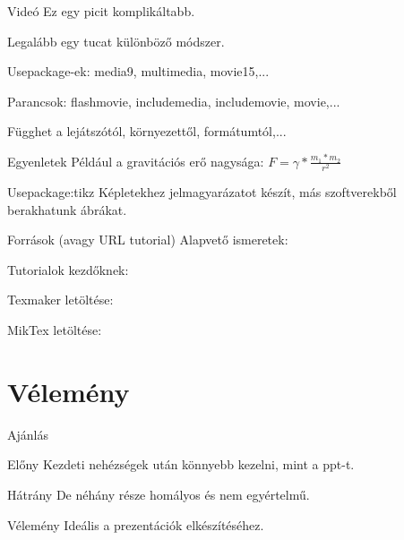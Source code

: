 \documentclass[11pt]{beamer}
\begin{document}
\begin{frame}{Videó}
Ez egy picit komplikáltabb.

Legalább egy tucat különböző módszer.

\alert{Usepackage-ek}: media9, multimedia, movie15,...

\alert{Parancsok}: flashmovie, includemedia, includemovie, movie,...

Függhet a lejátszótól, környezettől, formátumtól,...
\end{frame}

\begin{frame}{Egyenletek}
Például a gravitációs erő nagysága: $F=\gamma*\frac{m_1*m_2}{r^2}$
\begin{block}{Usepackage:\alert{tikz}}
Képletekhez jelmagyarázatot készít, más szoftverekből berakhatunk ábrákat.
\end{block}
\end{frame}

\begin{frame}{Források (avagy URL tutorial)}
Alapvető ismeretek:\href{https://www.overleaf.com/learn/latex/Beamer}{}

Tutorialok kezdőknek:\href{https://www.youtube.com/user/ShareLaTeX}{}

Texmaker letöltése:
\href{https://www.xm1math.net/texmaker/download.html}{}

MikTex letöltése:
\href{https://miktex.org/download}{}
\end{frame}

\section{Vélemény}

\begin{frame}{Ajánlás}
\begin{block}{Előny}
Kezdeti nehézségek után könnyebb kezelni, mint a ppt-t.
\end{block}

\begin{alertblock}{Hátrány}
De néhány része homályos és nem egyértelmű.
\end{alertblock}

\begin{block}{Vélemény}
Ideális a prezentációk elkészítéséhez.
\end{block}
\end{frame}
\end{document}
